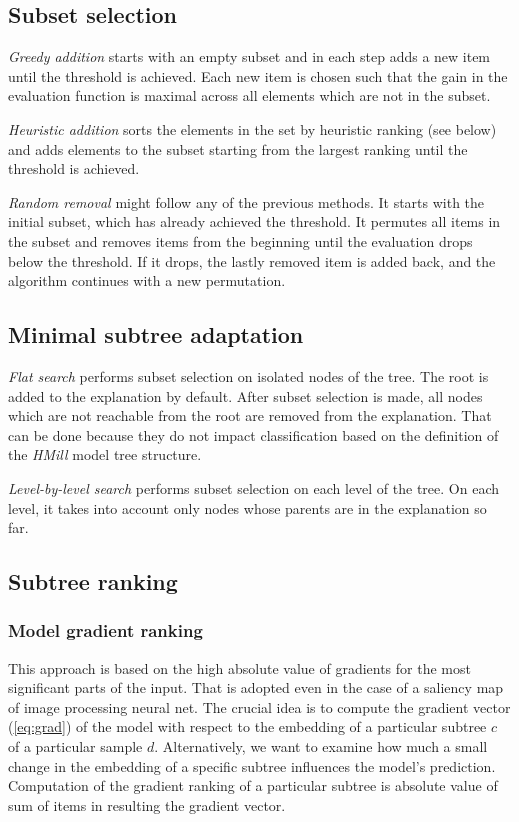 \subsection{Subset selection}
\emph{Greedy addition} starts with an empty subset and in each step adds a new item until the threshold is achieved. Each new item is chosen such that the gain in the evaluation function is maximal across all elements which are not in the subset.

\emph{Heuristic addition} sorts the elements in the set by heuristic ranking (see below) and adds elements to the subset starting from the largest ranking until the threshold is achieved.

\emph{Random removal} might follow any of the previous methods. It starts with the initial subset, which has already achieved the threshold. It permutes all items in the subset and removes items from the beginning until the evaluation drops below the threshold. If it drops, the lastly removed item is added back, and the algorithm continues with a new permutation.
\subsection{Minimal subtree adaptation}
\emph{Flat search} performs subset selection on isolated nodes of the tree. The root is added to the explanation by default. After subset selection is made, all nodes which are not reachable from the root are removed from the explanation. That can be done because they do not impact classification based on the definition of the \emph{HMill} model tree structure.

\emph{Level-by-level search} performs subset selection on each level of the tree. On each level, it takes into account only nodes whose parents are in the explanation so far.

\subsection{Subtree ranking}
\subsubsection{Model gradient ranking}
This approach is based on the high absolute value of gradients for the most significant parts of the input. That is adopted even in the case of a saliency map of image processing neural net. The crucial idea is to compute the gradient vector (\eqref{eq:grad}) of the model with respect to the embedding of a particular subtree $c$ of a particular sample $d$. Alternatively, we want to examine how much a small change in the embedding of a specific subtree influences the model's prediction. Computation of the gradient ranking of a particular subtree is absolute value of sum of items in resulting the gradient vector.

